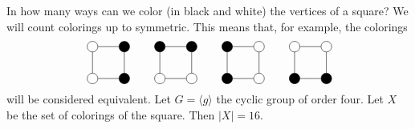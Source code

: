 \begin{optional}
    
\begin{example}
    In how many ways can we color (in black and white) the vertices of a square? 
    We will count colorings up to symmetric. This means that, for example, 
    the colorings 
    \begin{equation}
    \label{eq:orbita}
    \begin{tikzpicture}
        \node[shape=circle,draw=black,fill=black] (A) at (1,0){};
        \node[shape=circle,draw=black,fill=black] (B) at (1,1){};
        \node[shape=circle,draw=black] (C) at (0,1){}; 
        \node[shape=circle,draw=black] (D) at (0,0){};
        \path [-](A) edge node[left]{} (B);
        \path [-](B) edge node[left]{} (C);
        \path [-](C) edge node[left]{} (D);
        \path [-](D) edge node[left]{} (A);
    \end{tikzpicture}
    \qquad
    \begin{tikzpicture}
        \node[shape=circle,draw=black] (A) at (1,0) {};
        \node[shape=circle,draw=black,fill=black] (B) at (1,1) {};
        \node[shape=circle,draw=black,fill=black] (C) at (0,1) {};
        \node[shape=circle,draw=black] (D) at (0,0) {};
        \path [-](A) edge node[left]{} (B);
        \path [-](B) edge node[left]{} (C);
        \path [-](C) edge node[left]{} (D);
        \path [-](D) edge node[left]{} (A);
    \end{tikzpicture}
    \qquad
    \begin{tikzpicture}
        \node[shape=circle,draw=black] (A) at (1,0) {};
        \node[shape=circle,draw=black] (B) at (1,1) {};
        \node[shape=circle,draw=black,fill=black] (C) at (0,1) {};
        \node[shape=circle,draw=black,fill=black] (D) at (0,0) {};
        \path [-](A) edge node[left]{} (B);
        \path [-](B) edge node[left]{} (C);
        \path [-](C) edge node[left]{} (D);
        \path [-](D) edge node[left]{} (A);
    \end{tikzpicture}
    \qquad
    \begin{tikzpicture}
        \node[shape=circle,draw=black,fill=black] (A) at (1,0) {};
        \node[shape=circle,draw=black] (B) at (1,1) {};
        \node[shape=circle,draw=black] (C) at (0,1) {};
        \node[shape=circle,draw=black,fill=black] (D) at (0,0) {};
        \path [-](A) edge node[left]{} (B);
        \path [-](B) edge node[left]{} (C);
        \path [-](C) edge node[left]{} (D);
        \path [-](D) edge node[left]{} (A);
    \end{tikzpicture}
\end{equation}
will be considered equivalent. Let $G=\langle g\rangle$ the cyclic 
group of order four. Let $X$ be 
the set of colorings of the square. Then 
$|X|=16$. 


\end{example}
\end{optional}
